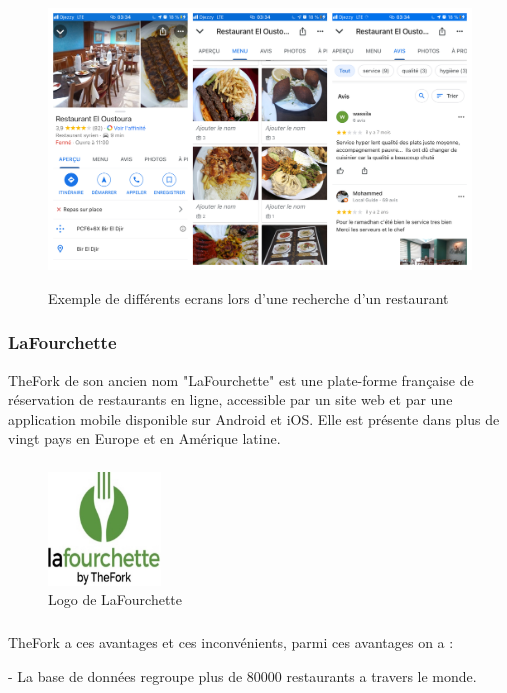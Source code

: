 	\begin{figure}[!ht]

		\centering
		\includegraphics[width=4.5in]{images/Chapitre1/page_resto.jpg}
		\label{fig:pageresto}
		\caption{Exemple de différents ecrans lors d'une recherche d'un restaurant }
	 \end{figure}
	 
\newpage

\subsubsection{LaFourchette}
TheFork de son ancien nom "LaFourchette" est une plate-forme française de réservation de restaurants en ligne, accessible par un site web et par une application mobile disponible sur Android et iOS. Elle est présente dans plus de vingt pays en Europe et en Amérique latine.~\cite{TheFork2020}
\subparagraph*{}
\begin{figure}
    \vspace{-15pt}
    \includegraphics[width=3cm]{images/Chapitre1/lafourchette.jpg}
    \vspace{-20pt}
    \caption{{\footnotesize Logo de LaFourchette}}
\end{figure}

\subparagraph*{}
TheFork a ces avantages et ces inconvénients, parmi ces avantages on a :\bigskip

	\tab- La base de données regroupe plus de 80000 restaurants a travers le monde.~\cite{RestaurantsSiteReservation} \medskip

